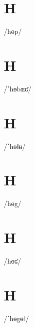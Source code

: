 \documentclass[10pt,a4paper,twoside]{book}
\begin{document}
\section*{H}

\begin{multicols}{3}
 {/hɵp/} {}
\end{multicols}

\section*{H}

\begin{multicols}{3}
 {/ˈhɵbɶʛ/} {}
\end{multicols}

\section*{H}

\begin{multicols}{3}
 {/ˈhɵǁʉ/} {}
\end{multicols}

\section*{H}

\begin{multicols}{3}
 {/hɵg/} {}
\end{multicols}

\section*{H}

\begin{multicols}{3}
 {/hɵʛ/} {}
\end{multicols}

\section*{H}

\begin{multicols}{3}
 {/ˈhɵgɵǁ/} {}
\end{multicols}
\end{document}

